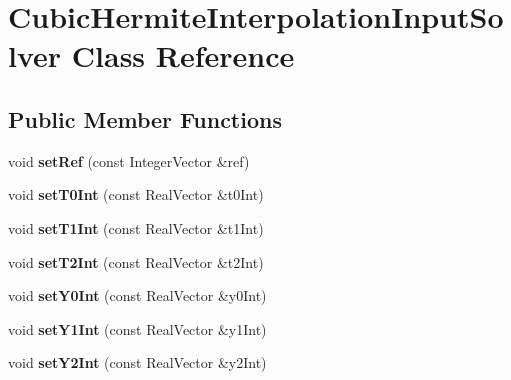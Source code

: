 \hypertarget{classCubicHermiteInterpolationInputSolver}{
\section{CubicHermiteInterpolationInputSolver Class Reference}
\label{classCubicHermiteInterpolationInputSolver}
}
\subsection*{Public Member Functions}
\begin{DoxyCompactItemize}
\item 
\hypertarget{classCubicHermiteInterpolationInputSolver_af88bf041935f0059d60cbc59d376c562}{
void {\bfseries setRef} (const IntegerVector \&ref)}
\label{classCubicHermiteInterpolationInputSolver_af88bf041935f0059d60cbc59d376c562}

\item 
\hypertarget{classCubicHermiteInterpolationInputSolver_a6595ab2c6bf05d8cac27bf61a15acf3b}{
void {\bfseries setT0Int} (const RealVector \&t0Int)}
\label{classCubicHermiteInterpolationInputSolver_a6595ab2c6bf05d8cac27bf61a15acf3b}

\item 
\hypertarget{classCubicHermiteInterpolationInputSolver_afb1bbd061fa2aee97f98d67d2471ee4d}{
void {\bfseries setT1Int} (const RealVector \&t1Int)}
\label{classCubicHermiteInterpolationInputSolver_afb1bbd061fa2aee97f98d67d2471ee4d}

\item 
\hypertarget{classCubicHermiteInterpolationInputSolver_a939b229acbe2594bf002c3efe4e68c94}{
void {\bfseries setT2Int} (const RealVector \&t2Int)}
\label{classCubicHermiteInterpolationInputSolver_a939b229acbe2594bf002c3efe4e68c94}

\item 
\hypertarget{classCubicHermiteInterpolationInputSolver_a7e38af555ded333308c026ffe9345d53}{
void {\bfseries setY0Int} (const RealVector \&y0Int)}
\label{classCubicHermiteInterpolationInputSolver_a7e38af555ded333308c026ffe9345d53}

\item 
\hypertarget{classCubicHermiteInterpolationInputSolver_a55eb332143a93ecaaa6c6cddbb13be28}{
void {\bfseries setY1Int} (const RealVector \&y1Int)}
\label{classCubicHermiteInterpolationInputSolver_a55eb332143a93ecaaa6c6cddbb13be28}

\item 
\hypertarget{classCubicHermiteInterpolationInputSolver_a46b4dfe81f7e03877dab1984426390ee}{
void {\bfseries setY2Int} (const RealVector \&y2Int)}
\label{classCubicHermiteInterpolationInputSolver_a46b4dfe81f7e03877dab1984426390ee}


\end{DoxyCompactItemize}
